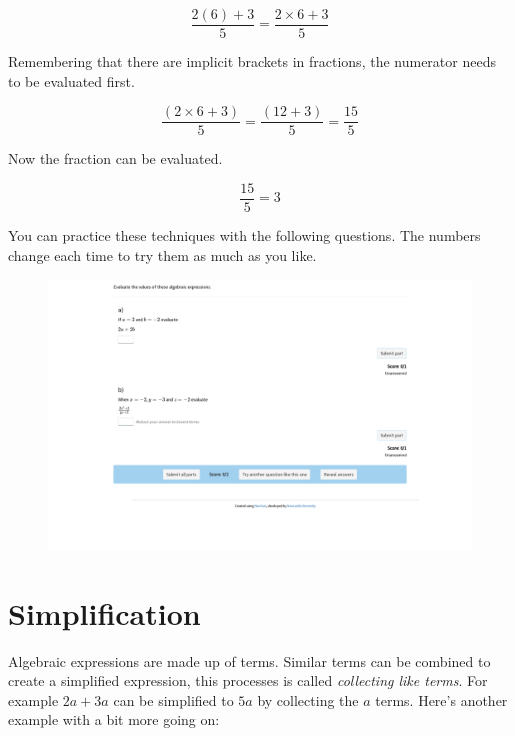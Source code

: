 \documentclass[
  a4paper,
]{scrbook}
\begin{document}
\[
\frac{2(6)+3}{5} = \frac{2 \times 6+3}{5}
\]

Remembering that there are implicit brackets in fractions, the numerator
needs to be evaluated first.

\[
\frac{(2 \times 6+3)}{5} = \frac{(12+3)}{5}=\frac{15}{5}
\]

Now the fraction can be evaluated.

\[
\frac{15}{5} = 3
\]

You can practice these techniques with the following questions. The
numbers change each time to try them as much as you like.

\begin{figure}

{\centering 

\href{https://numbas.mathcentre.ac.uk/question/126318/algebra-substitution/embed/?token=83a5d483-0d29-43d9-9569-f3b4d04ca26e}{\includegraphics{./02-algebraic_expressions_files/figure-pdf/unnamed-chunk-1-1.png}}

}

\end{figure}

\hypertarget{simplification}{%
\section{Simplification}\label{simplification}}

Algebraic expressions are made up of terms. Similar terms can be
combined to create a simplified expression, this processes is called
\emph{collecting like terms}. For example \(2a + 3a\) can be simplified
to \(5a\) by collecting the \(a\) terms. Here's another example with a
bit more going on:
\end{document}
